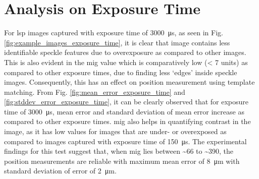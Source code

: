 
\section{Analysis on Exposure Time}\label{section:analysis_exposure_time}
    For \gls{lsp} images captured with exposure time of \SI{3000}{\micro\second}, as seen in Fig. \ref{fig:example_images_exposure_time}, it is clear that image contains less identifiable speckle features due to overexposure as compared to other images. This is also evident in the \gls{mig} value which is comparatively low (< 7 units) as compared to other exposure times, due to finding less `edges' inside speckle images. Consequently, this has an effect on position measurement using template matching. From Fig. \ref{fig:mean_error_exposure_time} and \ref{fig:stddev_error_exposure_time}, it can be clearly observed that for exposure time of \SI{3000}{\micro\second}, mean error and standard deviation of mean error increase as compared to other exposure times. \gls{mig} also helps in quantifying contrast in the image, as it has low values for images that are under- or overexposed as compared to images captured with exposure time of \SI{150}{\micro\second}. The experimental findings for this test suggest that, when \gls{mig} lies between \sim66 to \sim390, the position measurements are reliable with maximum mean error of \SI{8}{\micro\meter} with standard deviation of error of \SI{2}{\micro\meter}.

